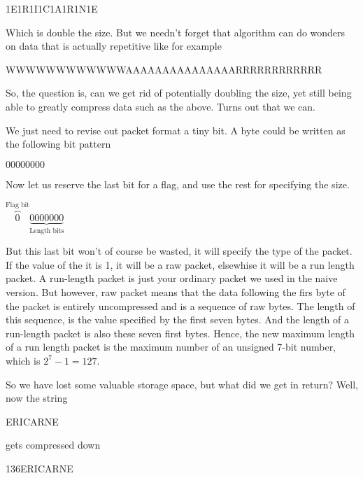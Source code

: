 \begin{refsection}
\begin{indentpar}
  1E1R1I1C1A1R1N1E
\end{indentpar}

Which is double the size. But we needn't forget that algorithm can
do wonders on data that is actually repetitive like for example

\begin{indentpar}
  WWWWWWWWWWWWAAAAAAAAAAAAAAARRRRRRRRRRRR
\end{indentpar}

So, the question is, can we get rid of potentially doubling the size,
yet still being able to greatly compress data such as the
above. Turns out that we can.

We just need to revise out packet format a tiny bit. A byte could be
written as the following bit pattern

\begin{indentpar}
  $00000000$
\end{indentpar}

Now let us reserve the last bit for a flag, and use the rest
for specifying the size.

\begin{indentpar}
  $\overbrace{0}^ \text{Flag bit}\underbrace{0000000}_ \text{Length bits}$
\end{indentpar}

But this last bit won't of course be wasted, it will specify the type
of the packet. If the value of the it is 1, it will be a raw packet,
elsewhise it will be a run length packet. A run-length packet is just
your ordinary packet we used in the naive version. But however, raw
packet means that the data following the firs byte of the packet is
entirely uncompressed and is a sequence of raw bytes. The length of
this sequence, is the value specified by the first seven bytes. And
the length of a run-length packet is also these seven first
bytes. Hence, the new maximum length of a run length packet is the
maximum number of an unsigned 7-bit number, which is $2^7 -1 = 127$.

So we have lost some valuable storage space, but what did we get in
return? Well, now the string

\begin{indentpar}
  ERICARNE
\end{indentpar}

gets compressed down

\begin{indentpar}
  136ERICARNE
\end{indentpar}


\end{refsection}
